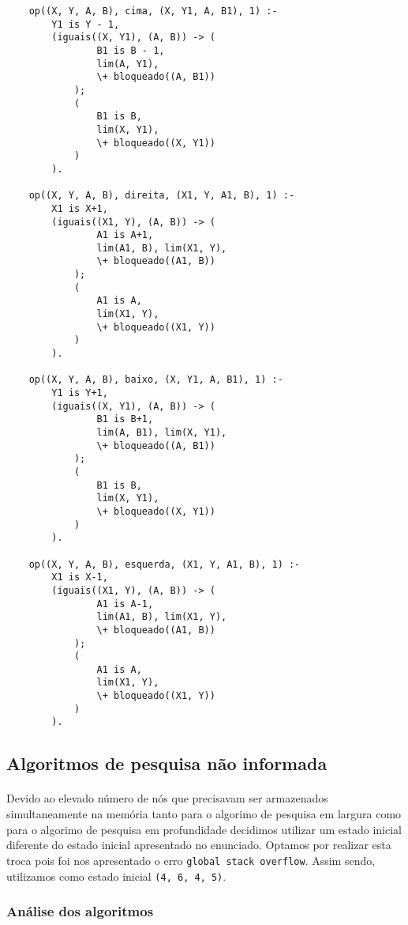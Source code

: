 \documentclass{article}
\begin{document}
\begin{verbatim}
    op((X, Y, A, B), cima, (X, Y1, A, B1), 1) :-
        Y1 is Y - 1,
        (iguais((X, Y1), (A, B)) -> (
                B1 is B - 1,
                lim(A, Y1),
                \+ bloqueado((A, B1))
            );
            (
                B1 is B,
                lim(X, Y1),
                \+ bloqueado((X, Y1))
            )
        ).
    
    op((X, Y, A, B), direita, (X1, Y, A1, B), 1) :-
        X1 is X+1,
        (iguais((X1, Y), (A, B)) -> (
                A1 is A+1,
                lim(A1, B), lim(X1, Y),
                \+ bloqueado((A1, B))
            );
            (
                A1 is A,
                lim(X1, Y),
                \+ bloqueado((X1, Y))
            )
        ).
    
    op((X, Y, A, B), baixo, (X, Y1, A, B1), 1) :-
        Y1 is Y+1,
        (iguais((X, Y1), (A, B)) -> (
                B1 is B+1,
                lim(A, B1), lim(X, Y1),
                \+ bloqueado((A, B1))
            );
            (
                B1 is B,
                lim(X, Y1),
                \+ bloqueado((X, Y1))
            )
        ).
    
    op((X, Y, A, B), esquerda, (X1, Y, A1, B), 1) :-
        X1 is X-1,
        (iguais((X1, Y), (A, B)) -> (
                A1 is A-1,
                lim(A1, B), lim(X1, Y),
                \+ bloqueado((A1, B))
            );
            (
                A1 is A,
                lim(X1, Y),
                \+ bloqueado((X1, Y))
            )
        ).
\end{verbatim}

\subsection{Algoritmos de pesquisa não informada}
\paragraph{} Devido ao elevado número de nós que precisavam ser armazenados simultaneamente na memória tanto para o algorimo de pesquisa em largura como para o algorimo de pesquisa em profundidade decidimos utilizar um estado inicial diferente do estado inicial apresentado no enunciado. Optamos por realizar esta troca pois foi nos apresentado o erro \texttt{global stack overflow}. Assim sendo, utilizamos como estado inicial \texttt{(4, 6, 4, 5)}. 

\subsubsection{Análise dos algoritmos}
\end{document}
